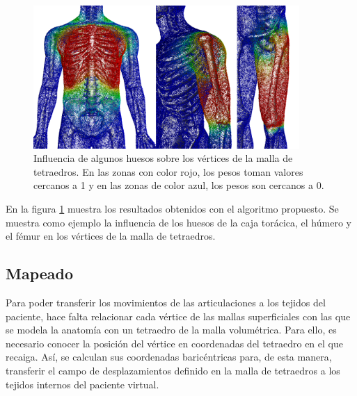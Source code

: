  \begin{figure}[ht]
   \centering
\includegraphics[width=0.9\textwidth]{IMG/weights.png}
     \caption{Influencia de algunos huesos sobre los vértices de la malla de tetraedros. En las zonas con color rojo, los pesos toman valores cercanos a 1 y en las zonas de color azul, los pesos son cercanos a 0.}
      \label{fig:pesado}
\end{figure}
 
En la figura \ref{fig:pesado} muestra los resultados obtenidos con el algoritmo propuesto. Se muestra  como ejemplo la influencia de los huesos de la caja torácica, el húmero y el fémur en los vértices de la malla de tetraedros.

\subsection{Mapeado}
\label{posing:Mapeado}
%
Para poder transferir los movimientos de las articulaciones a los tejidos del paciente, hace falta relacionar cada vértice de las mallas superficiales con las que se modela la anatomía con un tetraedro de la malla volumétrica. Para ello, es necesario conocer la posición del vértice en coordenadas del tetraedro en el que recaiga. Así, se calculan sus coordenadas baricéntricas para,  de esta manera, transferir el campo de desplazamientos definido en la malla de tetraedros a los tejidos internos del paciente virtual.




%



